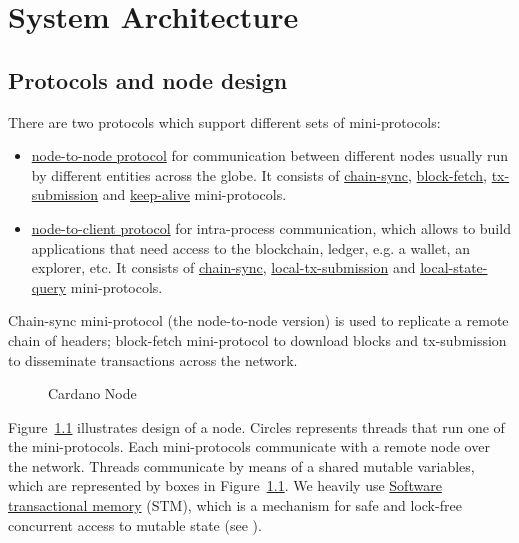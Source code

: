 \chapter{System Architecture}

\section{Protocols and node design}
There are two protocols which support different sets of mini-protocols:
\begin{itemize}
  \item\hyperref[section:node-to-node-protocol]{node-to-node protocol}
    for communication between different nodes usually run by different
    entities across the globe.  It consists of
    \hyperref[chain-sync-protocol]{chain-sync},
    \hyperref[block-fetch-protocol]{block-fetch},
    \hyperref[tx-submission-protocol]{tx-submission} and
    \hyperref[keep-alive-protocol]{keep-alive} mini-protocols.
  \item\hyperref[section:node-to-client-protocol]{node-to-client
    protocol} for intra-process communication, which allows to build
    applications that need access to the blockchain, ledger, e.g. a wallet, an
    explorer, etc.  It consists of \hyperref[chain-sync-protocol]{chain-sync},
    \hyperref[local-tx-submission-protocol]{local-tx-submission} and
    \hyperref[local-state-query-protocol]{local-state-query} mini-protocols.
\end{itemize}

Chain-sync mini-protocol (the node-to-node version) is used to replicate
a remote chain of headers; block-fetch mini-protocol to download blocks and
tx-submission to disseminate transactions across the network.

\begin{figure}
  \begin{center}
  \end{center}
  \caption{Cardano Node}
  \label{node-diagram-concurrency}
\end{figure}

Figure~\ref{node-diagram-concurrency} illustrates design of a node.  Circles
represents threads that run one of the mini-protocols.
Each mini-protocols communicate with a remote node over the network.
Threads communicate by means of a shared mutable variables, which
are represented by boxes in Figure~\ref{node-diagram-concurrency}.
We heavily use
\href{https://en.wikipedia.org/wiki/Software_transactional_memory}{Software
transactional memory} (STM), which is a mechanism for safe and lock-free
concurrent access to mutable state (see \cite{stm:harris2006}).

